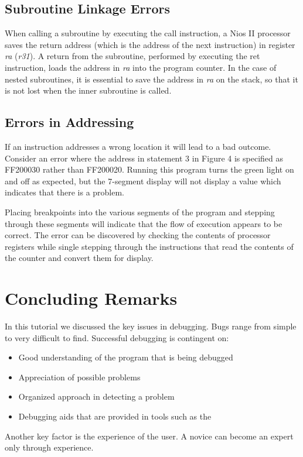 \documentclass[11pt, twoside, pdftex]{article}
\newcommand{\commonPath}{../../Common}
\begin{document}
\subsection{Subroutine Linkage Errors}
When calling a subroutine by executing the {\sf call} instruction, a Nios II 
processor saves the return address (which is the address of the next instruction)
in register {\it ra} ({\it r31}). A return from the subroutine, performed by
executing the {\sf ret} instruction, loads the address in {\it ra} into the
program counter. In the case of nested subroutines, it is essential to save
the address in {\it ra} on the stack, so that it is not lost when the inner
subroutine is called.

\subsection{Errors in Addressing}
If an instruction addresses a wrong location it will lead to a bad outcome.
Consider an error where the address in statement 3 in Figure 4 is specified
as FF200030 rather than FF200020. Running this program turns the green light on and
off as expected, but the 7-segment display will not display a value
which indicates that there is a problem.

Placing breakpoints into the various segments of the program and stepping
through these segments will indicate that the flow of execution appears to 
be correct. The error can be discovered by checking the contents of processor
registers while single stepping through the instructions that read the 
contents of the counter and convert them for display.

\section{Concluding Remarks}
In this tutorial we discussed the key issues in debugging. Bugs range from
simple to very difficult to find. Successful debugging is contingent on:
\begin{itemize}
\item Good understanding of the program that is being debugged
\item Appreciation of possible problems
\item Organized approach in detecting a problem
\item Debugging aids that are provided in tools such as the \productNameMed{}
\end{itemize}

\noindent
Another key factor is the experience of the user. A novice can become
an expert only through experience.



\end{document}
